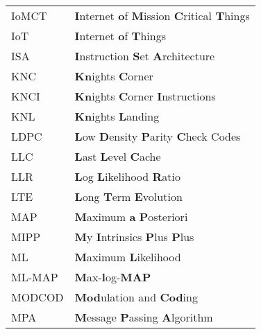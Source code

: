 \begin{center}
\begin{longtable}{ p{}  p{} }
IoMCT       & \textbf{I}nternet \textbf{o}f \textbf{M}ission \textbf{C}ritical \textbf{T}hings                                \\
IoT         & \textbf{I}nternet \textbf{o}f \textbf{T}hings                                                                   \\
ISA         & \textbf{I}nstruction \textbf{S}et \textbf{A}rchitecture                                                         \\
KNC         & \textbf{Kn}ights \textbf{C}orner                                                                                \\
KNCI        & \textbf{Kn}ights \textbf{C}orner \textbf{I}nstructions                                                          \\
KNL         & \textbf{Kn}ights \textbf{L}anding                                                                               \\
LDPC        & \textbf{L}ow \textbf{D}ensity \textbf{P}arity \textbf{C}heck Codes                                              \\
LLC         & \textbf{L}ast \textbf{L}evel \textbf{C}ache                                                                     \\
LLR         & \textbf{L}og \textbf{L}ikelihood \textbf{R}atio                                                                 \\
LTE         & \textbf{L}ong \textbf{T}erm \textbf{E}volution                                                                  \\
MAP         & \textbf{M}aximum \textbf{a} \textbf{P}osteriori                                                                 \\
MIPP        & \textbf{M}y \textbf{I}ntrinsics \textbf{P}lus \textbf{P}lus                                                     \\
ML          & \textbf{M}aximum \textbf{L}ikelihood                                                                            \\
ML-MAP      & \textbf{M}ax-\textbf{l}og-\textbf{MAP}                                                                          \\
MODCOD      & \textbf{Mod}ulation and \textbf{Cod}ing                                                                         \\
MPA         & \textbf{M}essage \textbf{P}assing \textbf{A}lgorithm                                                            \\

\end{longtable}
\end{center}
